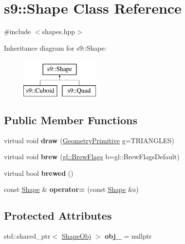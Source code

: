 \hypertarget{classs9_1_1Shape}{\section{s9\-:\-:Shape Class Reference}
\label{classs9_1_1Shape}
}


{\ttfamily \#include $<$shapes.\-hpp$>$}

Inheritance diagram for s9\-:\-:Shape\-:\begin{figure}[H]
\begin{center}
\leavevmode
\includegraphics[height=2.000000cm]{classs9_1_1Shape}
\end{center}
\end{figure}
\subsection*{Public Member Functions}
\begin{DoxyCompactItemize}
\item 
\hypertarget{classs9_1_1Shape_ae9ef06c2ced4223d73d089b0a86c1425}{virtual void {\bfseries draw} (\hyperlink{namespaces9_ad57d1332f8fd67d23f6a1d3520ab785c}{Geometry\-Primitive} g=T\-R\-I\-A\-N\-G\-L\-E\-S)}\label{classs9_1_1Shape_ae9ef06c2ced4223d73d089b0a86c1425}

\item 
\hypertarget{classs9_1_1Shape_a46eee9a8b5e93f0824dbc5a2ab09ef9d}{virtual void {\bfseries brew} (\hyperlink{structs9_1_1gl_1_1BrewFlags}{gl\-::\-Brew\-Flags} b=gl\-::\-Brew\-Flags\-Default)}\label{classs9_1_1Shape_a46eee9a8b5e93f0824dbc5a2ab09ef9d}

\item 
\hypertarget{classs9_1_1Shape_a7a466911ab12c422e97afd09e3dd0477}{virtual bool {\bfseries brewed} ()}\label{classs9_1_1Shape_a7a466911ab12c422e97afd09e3dd0477}

\item 
\hypertarget{classs9_1_1Shape_a54e221bed4dbe4ba444a9a64dc53ca04}{const \hyperlink{classs9_1_1Shape}{Shape} \& {\bfseries operator=} (const \hyperlink{classs9_1_1Shape}{Shape} \&s)}\label{classs9_1_1Shape_a54e221bed4dbe4ba444a9a64dc53ca04}

\end{DoxyCompactItemize}
\subsection*{Protected Attributes}
\begin{DoxyCompactItemize}
\item 
\hypertarget{classs9_1_1Shape_ace0e8a8ee82a37014630fd7b91cfcc66}{std\-::shared\-\_\-ptr$<$ \hyperlink{structs9_1_1ShapeObj}{Shape\-Obj} $>$ {\bfseries obj\-\_\-} = nullptr}\label{classs9_1_1Shape_ace0e8a8ee82a37014630fd7b91cfcc66}

\end{DoxyCompactItemize}



